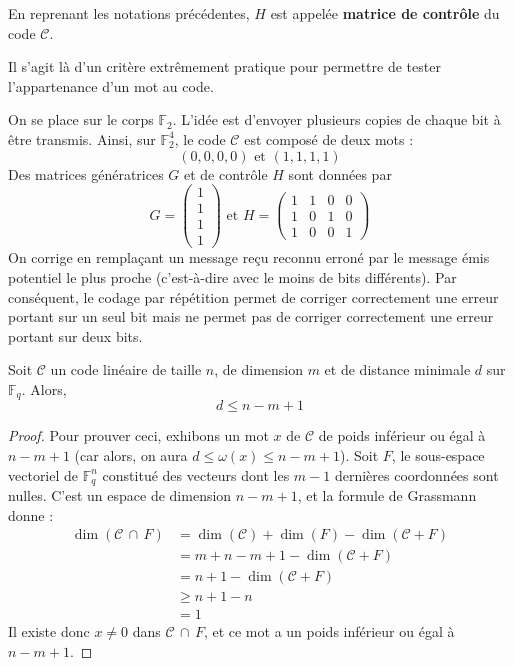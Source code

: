   \begin{definition}
    En reprenant les notations précédentes, $H$ est appelée \textbf{matrice de contrôle} du code $\mathcal{C}$.
  \end{definition}

  Il s'agit là d'un critère extrêmement pratique pour permettre de tester l'appartenance d'un mot au code.

  \begin{example}
    On se place sur le corps $\mathbb{F}_2$. L'idée est d'envoyer plusieurs copies de chaque bit à être transmis. Ainsi, sur $\mathbb{F}_2^4$, le code $\mathcal{C}$ est composé de deux mots :
    \[ (0,0,0,0) \text{ et } (1,1,1,1) \]
    Des matrices génératrices $G$ et de contrôle $H$ sont données par
    \[
      G = \begin{pmatrix}
        1 \\
        1 \\
        1 \\
        1
      \end{pmatrix}
      \text{ et }
      H = \begin{pmatrix}
        1 & 1 & 0 & 0 \\
        1 & 0 & 1 & 0 \\
        1 & 0 & 0 & 1
      \end{pmatrix}
    \]
    On corrige en remplaçant un message reçu reconnu erroné par le message émis potentiel le plus proche (c'est-à-dire avec le moins de bits différents). Par conséquent, le codage par répétition permet de corriger correctement une erreur portant sur un seul bit mais ne permet pas de corriger correctement une erreur portant sur deux bits.
  \end{example}

  \begin{proposition}
    Soit $\mathcal{C}$ un code linéaire de taille $n$, de dimension $m$ et de distance minimale $d$ sur $\mathbb{F}_q$. Alors,
    \[ d \leq n-m+1 \]
  \end{proposition}

  \begin{proof}
    Pour prouver ceci, exhibons un mot $x$ de $\mathcal{C}$ de poids inférieur ou égal à $n-m+1$ (car alors, on aura $d \leq \omega(x) \leq n-m+1$). Soit $F$, le sous-espace vectoriel de $\mathbb{F}_q^n$ constitué des vecteurs dont les $m-1$ dernières coordonnées sont nulles. C'est un espace de dimension $n-m+1$, et la formule de Grassmann donne :
    \begin{align*}
      \dim(\mathcal{C} \, \cap \, F) &= \dim(\mathcal{C}) + \dim(F) - \dim(\mathcal{C} + F) \\
      &= m + n - m + 1 - \dim(\mathcal{C} + F) \\
      &= n + 1 - \dim(\mathcal{C} + F) \\
      &\geq n + 1 - n \\
      &= 1
    \end{align*}
    Il existe donc $x \neq 0$ dans $\mathcal{C} \, \cap \, F$, et ce mot a un poids inférieur ou égal à $n-m+1$.
  \end{proof}

